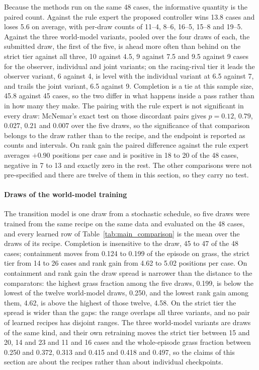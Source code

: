 \documentclass[journal]{IEEEtran}
\begin{document}
Because the methods run on the same 48 cases, the informative quantity is the
paired count. Against the rule expert the proposed controller wins 13.8 cases
and loses 5.6 on average, with per-draw counts of 11--4, 8--6, 16--5, 15--8 and
19--5. Against the three world-model variants, pooled over the four draws of
each, the submitted draw, the first of the five, is ahead more often than behind
on the strict tier
against all three, 10 against 4.5, 9 against 7.5 and 9.5 against 9 cases for the
observer, individual and joint variants; on the racing-rival tier it leads the
observer variant, 6 against 4, is level with the individual variant at 6.5
against 7, and trails the joint variant, 6.5 against 9. Completion is a tie at this
sample size, 45.8 against 45 cases, so the two differ in what happens inside a
pass rather than in how many they make. The pairing with the rule expert is not
significant in every draw: McNemar's exact test on those discordant pairs gives
$p=0.12$, $0.79$, $0.027$, $0.21$ and $0.007$ over the five draws, so the
significance of that comparison belongs to the draw rather than to the recipe,
and the endpoint is reported as counts and intervals. On rank gain the paired
difference against the rule expert averages $+0.90$ positions per case and is
positive in 18 to 20 of the 48 cases, negative in 7 to 13 and exactly zero in
the rest. The other comparisons were not pre-specified and there are twelve of
them in this section, so they carry no test.
\paragraph{Draws of the world-model training}
The transition model is one draw from a stochastic schedule, so five draws were
trained from the same recipe on the same data and evaluated on the 48 cases, and
every learned row of Table~\ref{tab:main_comparison} is the mean over the draws
of its recipe.
Completion is insensitive to the draw, 45 to 47 of the 48 cases; containment
moves from 0.124 to 0.199 of the episode on grass, the strict tier from 14 to 26
cases and rank gain from 4.62 to 5.02 positions per case. On containment and
rank gain the draw spread is narrower than the distance to the comparators: the
highest grass fraction among the five draws, 0.199, is below the lowest of the
twelve world-model draws, 0.250, and the lowest rank gain among them, 4.62, is
above the highest of those twelve, 4.58. On the strict tier the spread is wider
than the gaps: the range overlaps all three variants, and no pair of learned
recipes has disjoint ranges. The three world-model
variants are draws of the same kind, and their own retraining moves the strict
tier between 15 and 20, 14 and 23 and 11 and 16 cases and the whole-episode
grass fraction between 0.250 and 0.372, 0.313 and 0.415 and 0.418 and 0.497, so
the claims of this section are about the recipes rather than about individual
checkpoints.
\end{document}
